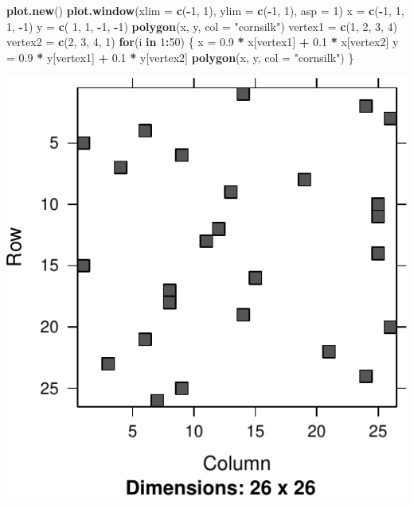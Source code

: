 \documentclass[]{book}
\newenvironment{Shaded}{\begin{snugshade}}{\end{snugshade}}
\newcommand{\KeywordTok}[1]{\textcolor[rgb]{0.13,0.29,0.53}{\textbf{#1}}}
\newcommand{\DataTypeTok}[1]{\textcolor[rgb]{0.13,0.29,0.53}{#1}}
\newcommand{\DecValTok}[1]{\textcolor[rgb]{0.00,0.00,0.81}{#1}}
\newcommand{\FloatTok}[1]{\textcolor[rgb]{0.00,0.00,0.81}{#1}}
\newcommand{\StringTok}[1]{\textcolor[rgb]{0.31,0.60,0.02}{#1}}
\newcommand{\ControlFlowTok}[1]{\textcolor[rgb]{0.13,0.29,0.53}{\textbf{#1}}}
\newcommand{\OperatorTok}[1]{\textcolor[rgb]{0.81,0.36,0.00}{\textbf{#1}}}
\newcommand{\NormalTok}[1]{#1}
\theoremstyle{definition}
\theoremstyle{definition}
\theoremstyle{definition}
\theoremstyle{remark}
\begin{document}
\begin{Shaded}
\begin{Highlighting}[]
\KeywordTok{plot.new}\NormalTok{()}
\KeywordTok{plot.window}\NormalTok{(}\DataTypeTok{xlim =} \KeywordTok{c}\NormalTok{(}\OperatorTok{-}\DecValTok{1}\NormalTok{, }\DecValTok{1}\NormalTok{), }\DataTypeTok{ylim =} \KeywordTok{c}\NormalTok{(}\OperatorTok{-}\DecValTok{1}\NormalTok{, }\DecValTok{1}\NormalTok{), }\DataTypeTok{asp =} \DecValTok{1}\NormalTok{)}
\NormalTok{x =}\StringTok{ }\KeywordTok{c}\NormalTok{(}\OperatorTok{-}\DecValTok{1}\NormalTok{, }\DecValTok{1}\NormalTok{, }\DecValTok{1}\NormalTok{, }\OperatorTok{-}\DecValTok{1}\NormalTok{)}
\NormalTok{y =}\StringTok{ }\KeywordTok{c}\NormalTok{( }\DecValTok{1}\NormalTok{, }\DecValTok{1}\NormalTok{, }\OperatorTok{-}\DecValTok{1}\NormalTok{, }\OperatorTok{-}\DecValTok{1}\NormalTok{)}
\KeywordTok{polygon}\NormalTok{(x, y, }\DataTypeTok{col =} \StringTok{"cornsilk"}\NormalTok{)}
\NormalTok{vertex1 =}\StringTok{ }\KeywordTok{c}\NormalTok{(}\DecValTok{1}\NormalTok{, }\DecValTok{2}\NormalTok{, }\DecValTok{3}\NormalTok{, }\DecValTok{4}\NormalTok{)}
\NormalTok{vertex2 =}\StringTok{ }\KeywordTok{c}\NormalTok{(}\DecValTok{2}\NormalTok{, }\DecValTok{3}\NormalTok{, }\DecValTok{4}\NormalTok{, }\DecValTok{1}\NormalTok{)}
\ControlFlowTok{for}\NormalTok{(i }\ControlFlowTok{in} \DecValTok{1}\OperatorTok{:}\DecValTok{50}\NormalTok{) \{}
\NormalTok{    x =}\StringTok{ }\FloatTok{0.9} \OperatorTok{*}\StringTok{ }\NormalTok{x[vertex1] }\OperatorTok{+}\StringTok{ }\FloatTok{0.1} \OperatorTok{*}\StringTok{ }\NormalTok{x[vertex2]}
\NormalTok{    y =}\StringTok{ }\FloatTok{0.9} \OperatorTok{*}\StringTok{ }\NormalTok{y[vertex1] }\OperatorTok{+}\StringTok{ }\FloatTok{0.1} \OperatorTok{*}\StringTok{ }\NormalTok{y[vertex2]}
    \KeywordTok{polygon}\NormalTok{(x, y, }\DataTypeTok{col =} \StringTok{"cornsilk"}\NormalTok{)}
\NormalTok{\}}
\end{Highlighting}
\end{Shaded}

\includegraphics[width=0.5\linewidth]{Rcourse_files/figure-latex/unnamed-chunk-261-1}
\end{document}
